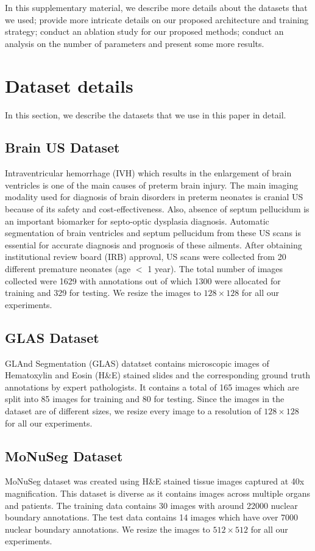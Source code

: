 \documentclass[runningheads]{llncs}
\begin{document}
	In this supplementary material, we describe more details about the datasets that we used; provide more intricate details on our proposed architecture and training strategy; conduct an ablation study for our proposed methods; conduct an analysis on the number of parameters and present some more results.
	
	\section{Dataset details}
	
	In this section, we describe the datasets that we use in this paper in detail.
	\subsection{Brain US Dataset} Intraventricular hemorrhage (IVH) which results in the enlargement of brain ventricles is one of the main causes of preterm brain injury. The main imaging modality used for diagnosis of brain disorders in preterm neonates is cranial US because of its safety and cost-effectiveness. Also, absence of septum pellucidum is an important biomarker for septo-optic dysplasia diagnosis. Automatic segmentation of brain ventricles and septum pellucidum from these US scans is essential for accurate diagnosis and prognosis of these ailments. After obtaining institutional review board (IRB) approval, US scans were collected from 20 different premature neonates (age $<$ 1 year). The total number of images collected were 1629 with annotations out of which 1300 were allocated for training and 329 for testing. We resize the images to $128\times128$ for all our experiments.
	
	
	
	\subsection{GLAS Dataset} GLAnd Segmentation (GLAS) datatset \cite{sirinukunwattana2017gland} contains microscopic images of Hematoxylin and Eosin (H\&E) stained slides and the corresponding ground truth annotations by expert pathologists. It contains a total of 165 images which are split into 85 images for training and 80 for testing. Since the images in the dataset are of different sizes, we resize every image to a resolution of $128\times128$ for all our experiments. 
	
	\subsection{MoNuSeg Dataset} MoNuSeg dataset \cite{kumar2019multi,kumar2017dataset} was created using H\&E stained tissue images captured at 40x magnification. This dataset is diverse as it contains images across multiple organs and patients. The training data contains 30 images with around 22000 nuclear boundary annotations. The test data contains 14 images which have over 7000 nuclear boundary annotations. We resize the images to $512\times512$ for all our experiments.
	
\end{document}
